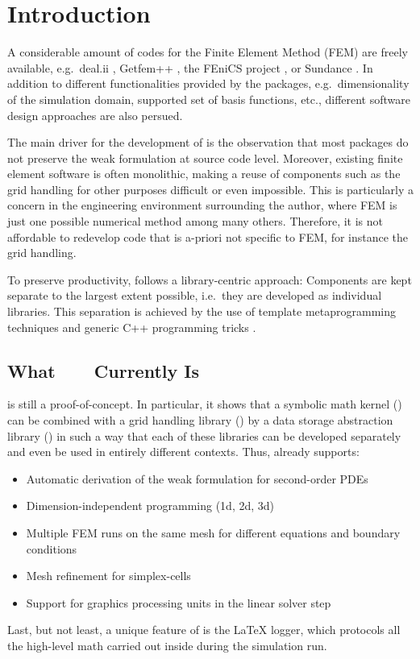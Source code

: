 
\chapter*{Introduction}    \label{intro}

A considerable amount of codes for the Finite Element Method (FEM) are freely available, e.g.~deal.ii \cite{deal.II}, Getfem++ \cite{Getfem++}, the FEniCS project \cite{FEniCS}, or Sundance \cite{Sundance}.
In addition to different functionalities provided by the packages, e.g.~dimensionality of the simulation domain, supported set of basis functions, etc., different software design approaches are also persued.

The main driver for the development of {\ViennaFEM} is the observation that most packages do not preserve the weak formulation at source code level.
Moreover, existing finite element software is often monolithic, making a reuse of components such as the grid handling for other purposes difficult or even impossible.
This is particularly a concern in the engineering environment surrounding the author, where FEM is just one possible numerical method among many others.
Therefore, it is not affordable to redevelop code that is a-priori not specific to FEM, for instance the grid handling.

To preserve productivity, {\ViennaFEM} follows a library-centric approach: Components are kept separate to the largest extent possible, i.e.~they are developed as individual libraries.
This separation is achieved by the use of template metaprogramming techniques \cite{Vandevoorde:CppTemplates} and generic C++ programming tricks \cite{Alexandrescu:ModernCpp}.

\section*{What\ \ {\ViennaFEM}\ \ Currently Is}
{\ViennaFEMversion} is still a proof-of-concept. In particular, it shows that a symbolic math kernel (\ViennaMath) can be combined with a grid handling library (\ViennaGrid) by a data storage abstraction library (\ViennaData) in such a way that each of these libraries can be developed separately and even be used in entirely different contexts.
Thus, {\ViennaFEMversion} already supports:
\begin{itemize}
 \item Automatic derivation of the weak formulation for second-order PDEs
 \item Dimension-independent programming (1d, 2d, 3d)
 \item Multiple FEM runs on the same mesh for different equations and boundary conditions
 \item Mesh refinement for simplex-cells
 \item Support for graphics processing units in the linear solver step
\end{itemize}
Last, but not least, a unique feature of {\ViennaFEM} is the {\LaTeX} logger, which protocols all the high-level math carried out inside {\ViennaFEM} during the simulation run.

